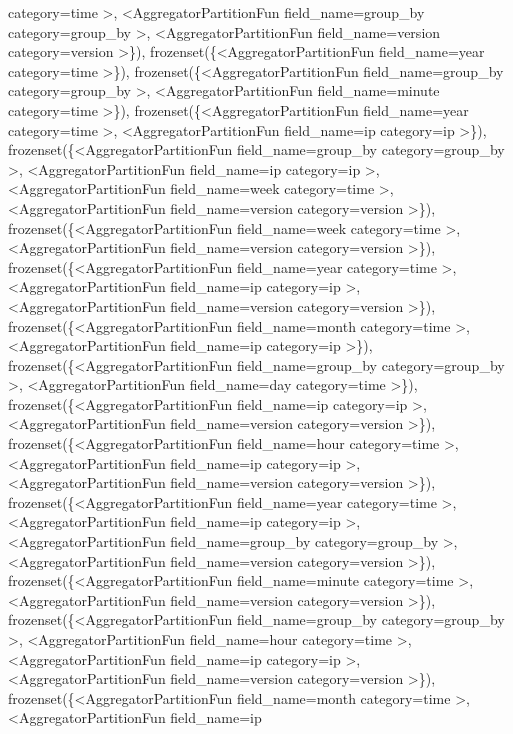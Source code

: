 \documentclass[letterpaper,10pt,english]{sphinxmanual}
\begin{document}
\begin{fulllineitems}
\begin{fulllineitems}
category=time \textgreater{}, \textless{}AggregatorPartitionFun field\_name=group\_by category=group\_by \textgreater{}, \textless{}AggregatorPartitionFun field\_name=version category=version \textgreater{}\}), frozenset(\{\textless{}AggregatorPartitionFun field\_name=year category=time \textgreater{}\}), frozenset(\{\textless{}AggregatorPartitionFun field\_name=group\_by category=group\_by \textgreater{}, \textless{}AggregatorPartitionFun field\_name=minute category=time \textgreater{}\}), frozenset(\{\textless{}AggregatorPartitionFun field\_name=year category=time \textgreater{}, \textless{}AggregatorPartitionFun field\_name=ip category=ip \textgreater{}\}), frozenset(\{\textless{}AggregatorPartitionFun field\_name=group\_by category=group\_by \textgreater{}, \textless{}AggregatorPartitionFun field\_name=ip category=ip \textgreater{}, \textless{}AggregatorPartitionFun field\_name=week category=time \textgreater{}, \textless{}AggregatorPartitionFun field\_name=version category=version \textgreater{}\}), frozenset(\{\textless{}AggregatorPartitionFun field\_name=week category=time \textgreater{}, \textless{}AggregatorPartitionFun field\_name=version category=version \textgreater{}\}), frozenset(\{\textless{}AggregatorPartitionFun field\_name=year category=time \textgreater{}, \textless{}AggregatorPartitionFun field\_name=ip category=ip \textgreater{}, \textless{}AggregatorPartitionFun field\_name=version category=version \textgreater{}\}), frozenset(\{\textless{}AggregatorPartitionFun field\_name=month category=time \textgreater{}, \textless{}AggregatorPartitionFun field\_name=ip category=ip \textgreater{}\}), frozenset(\{\textless{}AggregatorPartitionFun field\_name=group\_by category=group\_by \textgreater{}, \textless{}AggregatorPartitionFun field\_name=day category=time \textgreater{}\}), frozenset(\{\textless{}AggregatorPartitionFun field\_name=ip category=ip \textgreater{}, \textless{}AggregatorPartitionFun field\_name=version category=version \textgreater{}\}), frozenset(\{\textless{}AggregatorPartitionFun field\_name=hour category=time \textgreater{}, \textless{}AggregatorPartitionFun field\_name=ip category=ip \textgreater{}, \textless{}AggregatorPartitionFun field\_name=version category=version \textgreater{}\}), frozenset(\{\textless{}AggregatorPartitionFun field\_name=year category=time \textgreater{}, \textless{}AggregatorPartitionFun field\_name=ip category=ip \textgreater{}, \textless{}AggregatorPartitionFun field\_name=group\_by category=group\_by \textgreater{}, \textless{}AggregatorPartitionFun field\_name=version category=version \textgreater{}\}), frozenset(\{\textless{}AggregatorPartitionFun field\_name=minute category=time \textgreater{}, \textless{}AggregatorPartitionFun field\_name=version category=version \textgreater{}\}), frozenset(\{\textless{}AggregatorPartitionFun field\_name=group\_by category=group\_by \textgreater{}, \textless{}AggregatorPartitionFun field\_name=hour category=time \textgreater{}, \textless{}AggregatorPartitionFun field\_name=ip category=ip \textgreater{}, \textless{}AggregatorPartitionFun field\_name=version category=version \textgreater{}\}), frozenset(\{\textless{}AggregatorPartitionFun field\_name=month category=time \textgreater{}, \textless{}AggregatorPartitionFun field\_name=ip 
\end{fulllineitems}
\end{fulllineitems}
\end{document}
